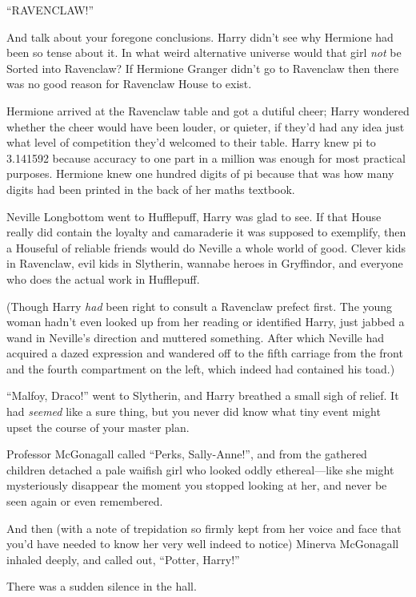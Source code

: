 ``RAVENCLAW!''

And talk about your foregone conclusions. Harry didn't see why Hermione
had been so tense about it. In what weird alternative universe would
that girl \emph{not} be Sorted into Ravenclaw? If Hermione Granger
didn't go to Ravenclaw then there was no good reason for Ravenclaw House
to exist.

Hermione arrived at the Ravenclaw table and got a dutiful cheer; Harry
wondered whether the cheer would have been louder, or quieter, if they'd
had any idea just what level of competition they'd welcomed to their
table. Harry knew pi to 3.141592 because accuracy to one part in a
million was enough for most practical purposes. Hermione knew one
hundred digits of pi because that was how many digits had been printed
in the back of her maths textbook.

Neville Longbottom went to Hufflepuff, Harry was glad to see. If that
House really did contain the loyalty and camaraderie it was supposed to
exemplify, then a Houseful of reliable friends would do Neville a whole
world of good. Clever kids in Ravenclaw, evil kids in Slytherin, wannabe
heroes in Gryffindor, and everyone who does the actual work in
Hufflepuff.

(Though Harry \emph{had} been right to consult a Ravenclaw prefect
first. The young woman hadn't even looked up from her reading or
identified Harry, just jabbed a wand in Neville's direction and muttered
something. After which Neville had acquired a dazed expression and
wandered off to the fifth carriage from the front and the fourth
compartment on the left, which indeed had contained his toad.)

``Malfoy, Draco!'' went to Slytherin, and Harry breathed a small sigh of
relief. It had \emph{seemed} like a sure thing, but you never did know
what tiny event might upset the course of your master plan.

Professor McGonagall called ``Perks, Sally-Anne!'', and from the
gathered children detached a pale waifish girl who looked oddly
ethereal---like she might mysteriously disappear the moment you stopped
looking at her, and never be seen again or even remembered.

And then (with a note of trepidation so firmly kept from her voice and
face that you'd have needed to know her very well indeed to notice)
Minerva McGonagall inhaled deeply, and called out, ``Potter, Harry!''

There was a sudden silence in the hall.

